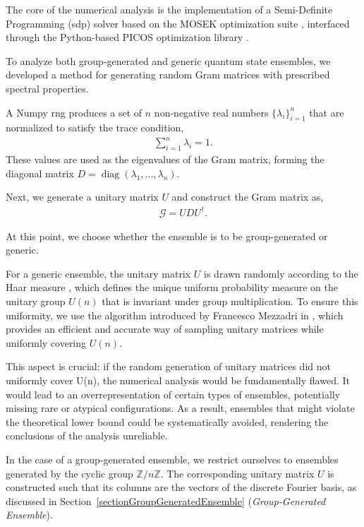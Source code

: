 \documentclass[12pt,letterpaper]{article}
\begin{document}
The core of the numerical analysis is the implementation of a Semi-Definite Programming (\gls{sdp}) solver based on the MOSEK optimization suite \cite{mosek_sdp}, interfaced through the Python-based PICOS optimization library \cite{PICOS}. 

To analyze both group-generated and generic quantum state ensembles, we developed a method for generating random Gram matrices with prescribed spectral properties.

A Numpy \gls{rng}\cite{numpyRNG} produces a set of $n$ non-negative real numbers $\{\lambda_i\}_{i=1}^n$ that are normalized to satisfy the trace condition,
\begin{align*}
	\sum_{i=1}^n \lambda_i = 1.
\end{align*}
These values are used as the eigenvalues of the Gram matrix, forming the diagonal matrix $D = \operatorname{diag}(\lambda_1, \dots, \lambda_n)$. 

Next, we generate a unitary matrix $U$ and construct the Gram matrix as,
\begin{align*}
	\mathcal{G} = U D U^\dagger.
\end{align*}

At this point, we choose whether the ensemble is to be group-generated or generic.

For a generic ensemble, the unitary matrix $U$ is drawn randomly according to the Haar measure \cite{haarMeasure}, which defines the unique uniform probability measure on the unitary group $U(n)$ that is invariant under group multiplication. To ensure this uniformity, we use the algorithm introduced by Francesco Mezzadri in \cite{UnitaryMatricesGeneration}, which provides an efficient and accurate way of sampling unitary matrices while uniformly covering $U(n)$. 

This aspect is crucial: if the random generation of unitary matrices did not uniformly cover U(n), the numerical analysis would be fundamentally flawed. It would lead to an overrepresentation of certain types of ensembles, potentially missing rare or atypical configurations. As a result, ensembles that might violate the theoretical lower bound could be systematically avoided, rendering the conclusions of the analysis unreliable.

In the case of a group-generated ensemble, we restrict ourselves to ensembles generated by the cyclic group $\mathbb{Z}/n\mathbb{Z}$. The corresponding unitary matrix $U$ is constructed such that its columns are the vectors of the discrete Fourier basis, as discussed in Section~\ref{sectionGroupGeneratedEnsemble} (\emph{Group-Generated Ensemble}).
\end{document}
